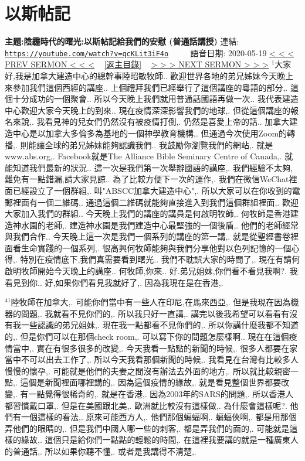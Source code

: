 \documentclass{book}
\begin{document}
\section{以斯帖記}
\label{sec:qcKLit3iF4o}
\textbf{主題:陰霾時代的曙光:以斯帖記給我們的安慰 (普通話講授)}
\newline
\newline
連結: \href{https://youtube.com/watch?v=qcKLit3iF4o}{\texttt{https://youtube.com/watch?v=qcKLit3iF4o}} ~~~~ 語音日期: 2020-05-19
\newline
\newline
\hyperref[sec:9pqygotXAuo]{\small{< < < PREV SERMON < < <}}
~
\hyperref[sec:index]{\small{[返主目錄]}}
~
\hyperref[sec:yb30yQHiYdM]{\small{> > > NEXT SERMON > > >}}
\newline
\newline
$^{1}$大家好,我是加拿大建造中心的總幹事陸昭敏牧師..
歡迎世界各地的弟兄姊妹今天晚上來參加我們這個西經的講座..
上個禮拜我們已經舉行了這個講座的粵語的部分,.
這個十分成功的一個聚會..
所以今天晚上我們就用普通話國語再做一次..
我代表建造中心歡迎大家今天晚上的到來..
現在疫情深深影響我們的地球,.
但從這個講座的報名來說,.
我看見神的兒女們仍然沒有被疫情打倒,.
仍然是喜愛上帝的話..
加拿大建造中心是以加拿大多倫多為基地的一個神學教育機構,.
但通過今次使用Zoom的轉播,.
則能讓全球的弟兄姊妹能夠認識我們..
我鼓勵你瀏覽我們的網站,.
就是www.abs.org,.
Facebook就是The Alliance Bible Seminary Centre of Canada,.
就能知道我們最新的狀況..
這一次是我們第一次舉辦國語的講座,.
我們經驗不太夠,難免有一點錯漏,請大家見諒..
為了比較方便下一次的運作,.
我們在微信WeChat裡面已經設立了一個群組,.
叫"ABSCC加拿大建造中心",.
所以大家可以在你收到的電郵裡面有一個二維碼,.
通過這個二維碼就能夠直接進入到我們這個群組裡面,.
歡迎大家加入我們的群組..
今天晚上我們的講座的講員是何啟明牧師,.
何牧師是香港建造神水園的老師,.
建造神水園是我們建造中心最堅強的一個後盾,.
他們的老師經常與我們合作..
今天晚上這一次是我們一個系列的講座的第一講,.
就是從聖經書卷裡面看生命實踐的一個系列,.
很高興何牧師能夠與我們分享他對以色列記憶的一個心得,.
特別在疫情底下,我們真需要看到曙光..
我們不耽誤大家的時間了,.
現在有請何啟明牧師開始今天晚上的講座..
何牧師,你來..
好.弟兄姐妹,你們看不看見我啊?.
我看見到你..
好,如果你們看見我就好了,.
因為我現在是在香港,.

$^{41}$陸牧師在加拿大,.
可能你們當中有一些人在印尼,在馬來西亞,.
但是我現在因為機器的問題,.
我就看不見你們的,.
所以我只好一直講,.
講完以後我希望可以看看有沒有我一些認識的弟兄姐妹,.
現在我一點都看不見你們的,.
所以你講什麼我都不知道的,.
但是你們可以在那個check room,.
可以寫下你的問題怎麼樣啊..
現在在這個疫情當中,.
實在有很多很多的改變,.
今天我看一點點的新聞的時候,.
很多人都要在家當中不可以出去工作了,.
所以今天我看那個新聞的時候,.
我看見在台灣有比較多人慢慢的懷孕,.
可能就是他們的夫妻之間沒有辦法去外面的地方,.
所以就比較親密一點,.
這個是新聞裡面哪裡講的,.
因為這個疫情的緣故,.
就是看見整個世界都要改變,.
有一點覺得很稀奇的,.
就是在香港,.
因為2003年的SARS的問題,.
所以香港人都習慣戴口罩,.
但是在美國跟北美,.
歐洲就比較沒有這樣做,.
為什麼會這樣呢?.
他們有一個這樣的看法,.
原來可能西方人,.
他們那個蝙蝠啊,.
蝙蝠俠啊,.
都是用那個弄他們的眼睛的,.
但是我們中國人哪一些的刺客,.
都是弄我們的面的,.
可能就是這樣的緣故,.
這個只是給你們一點點的輕鬆的時間,.
在這裡我要講的就是一種廣東人的普通話,.
所以如果你聽不懂,.
或者是我講得不清楚,.
\end{document}
